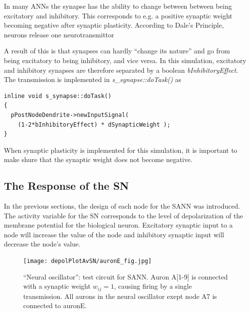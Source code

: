 	In many ANNs the synapse has the ability to change between between being excitatory and inhibitory. 
	This corresponds to e.g. a positive synaptic weight becoming negative after synaptic plasticity.
	According to Dale's Principle, neurons release one neurotransmittor\cite{NeuroscienceExploringTheBrain3edKAP6}

	A result of this is that synapses can hardly ``change its nature'' and go from being excitatory to being inhibitory, and vice versa.
	In this simulation, excitatory and inhibitory synapses are therefore separated by a boolean \emph{bInhibitoryEffect}. 
	The transmission is implemented in \emph{s\_synapse::doTask()} as
\begin{lstlisting}
inline void s_synapse::doTask()
{
  pPostNodeDendrite->newInputSignal( 
    (1-2*bInhibitoryEffect) * dSynapticWeight );
}
\end{lstlisting}

	When synaptic plasticity is implemented for this simulation, it is important to make shure that the synaptic weight does not become negative. 

\subsection{The Response of the SN}
	In the previous sections, the design of each node for the SANN was introduced.
	The activity variable for the SN corresponds to the level of depolarization of the membrane potential for the biological neuron.
	Excitatory synaptic input to a node will increase the value of the node and inhibitory synaptic input will decrease the node's value.

	\begin{figure}[hb!tp]
		\centering 		
		\texttt{[image: depolPlotAvSN/auronE\_fig.jpg]}
		\caption{``Neural oscillator'': test circuit for SANN. Auron A[1-9] is connected with a synaptic weight $w_{ij}=1$, causing firing by a single transmission. 
		All aurons in the neural oscillator exept node A7 is connected to auronE.
		}
		\label{figAuronE_schematics}
	\end{figure}

